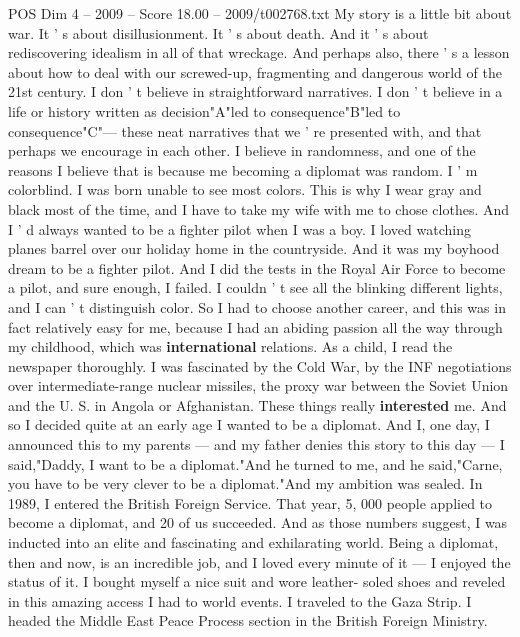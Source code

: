 \begin{textsample}{POS Dim 4 – 2009 – Score 18.00 – 2009/t002768.txt}  \label{ex:f4_pos_047}
My story is a little bit about war.
It ' s about disillusionment.
It ' s about death.
And it ' s about rediscovering idealism in all of that wreckage.
And perhaps also, there ' s a lesson about how to deal with our screwed-up, fragmenting and dangerous world of the 21st century.
I don ' t believe in straightforward narratives.
I don ' t believe in a life or history written as decision"A"led to consequence"B"led to consequence"C"— these neat narratives that we ' re presented with, and that perhaps we encourage in each other.
I believe in randomness, and one of the reasons I believe that is because me becoming a diplomat was random.
I ' m colorblind.
I was born unable to see most colors.
This is why I wear gray and black most of the time, and I have to take my wife with me to chose clothes.
And I ' d always wanted to be a fighter pilot when I was a boy.
I loved watching planes barrel over our holiday home in the countryside.
And it was my boyhood dream to be a fighter pilot.
And I did the tests in the Royal Air Force to become a pilot, and sure enough, I failed.
I couldn ' t see all the blinking different lights, and I can ' t distinguish color.
So I had to choose another career, and this was in fact relatively easy for me, because I had an abiding passion all the way through my childhood, which was \textbf{international} relations.
As a child, I read the newspaper thoroughly.
I was fascinated by the Cold War, by the INF negotiations over intermediate-range nuclear missiles, the proxy war between the Soviet Union and the U.
S. in Angola or Afghanistan.
These things really \textbf{interested} me.
And so I decided quite at an early age I wanted to be a diplomat.
And I, one day, I announced this to my parents — and my father denies this story to this day — I said,"Daddy, I want to be a diplomat."And he turned to me, and he said,"Carne, you have to be very clever to be a diplomat."And my ambition was sealed.
In 1989, I entered the British Foreign Service.
That year, 5, 000 people applied to become a diplomat, and 20 of us succeeded.
And as those numbers suggest, I was inducted into an elite and fascinating and exhilarating world.
Being a diplomat, then and now, is an incredible job, and I loved every minute of it — I enjoyed the status of it.
I bought myself a nice suit and wore leather- soled shoes and reveled in this amazing access I had to world events.
I traveled to the Gaza Strip.
I headed the Middle East Peace Process section in the British Foreign Ministry.

\end{textsample}
